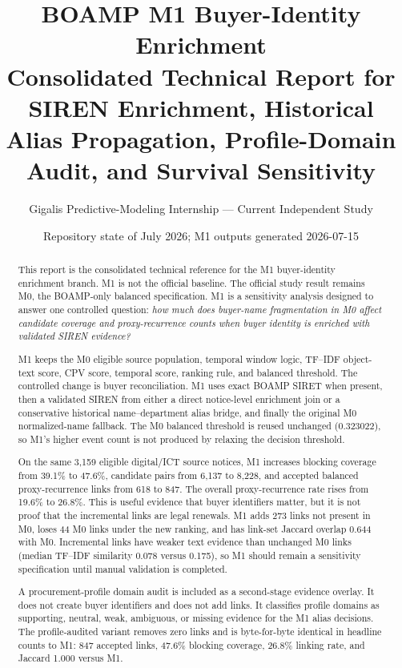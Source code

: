 \documentclass[11pt]{article}
\title{BOAMP M1 Buyer-Identity Enrichment\\
\large Consolidated Technical Report for SIREN Enrichment, Historical Alias
Propagation, Profile-Domain Audit, and Survival Sensitivity}
\author{Gigalis Predictive-Modeling Internship --- Current Independent Study}
\date{Repository state of July 2026; M1 outputs generated 2026-07-15}
\begin{document}
\maketitle

\begin{abstract}
This report is the consolidated technical reference for the M1
buyer-identity enrichment branch. M1 is not the official baseline. The
official study result remains M0, the BOAMP-only balanced specification.
M1 is a sensitivity analysis designed to answer one controlled question:
\emph{how much does buyer-name fragmentation in M0 affect candidate
coverage and proxy-recurrence counts when buyer identity is enriched with
validated SIREN evidence?}

M1 keeps the M0 eligible source population, temporal window logic,
TF--IDF object-text score, CPV score, temporal score, ranking rule, and
balanced threshold. The controlled change is buyer reconciliation. M1
uses exact BOAMP SIRET when present, then a validated SIREN from either a
direct notice-level enrichment join or a conservative historical
name--department alias bridge, and finally the original M0 normalized-name
fallback. The M0 balanced threshold is reused unchanged
($0.323022$), so M1's higher event count is not produced by relaxing the
decision threshold.

On the same 3,159 eligible digital/ICT source notices, M1 increases
blocking coverage from 39.1\% to 47.6\%, candidate pairs from 6,137 to
8,228, and accepted balanced proxy-recurrence links from 618 to 847. The
overall proxy-recurrence rate rises from 19.6\% to 26.8\%. This is useful
evidence that buyer identifiers matter, but it is not proof that the
incremental links are legal renewals. M1 adds 273 links not present in M0,
loses 44 M0 links under the new ranking, and has link-set Jaccard overlap
0.644 with M0. Incremental links have weaker text evidence than unchanged
M0 links (median TF--IDF similarity 0.078 versus 0.175), so M1 should
remain a sensitivity specification until manual validation is completed.

A procurement-profile domain audit is included as a second-stage evidence
overlay. It does not create buyer identifiers and does not add links. It
classifies profile domains as supporting, neutral, weak, ambiguous, or
missing evidence for the M1 alias decisions. The profile-audited variant
removes zero links and is byte-for-byte identical in headline counts to
M1: 847 accepted links, 47.6\% blocking coverage, 26.8\% linking rate, and
Jaccard 1.000 versus M1.
\end{abstract}
\end{document}
